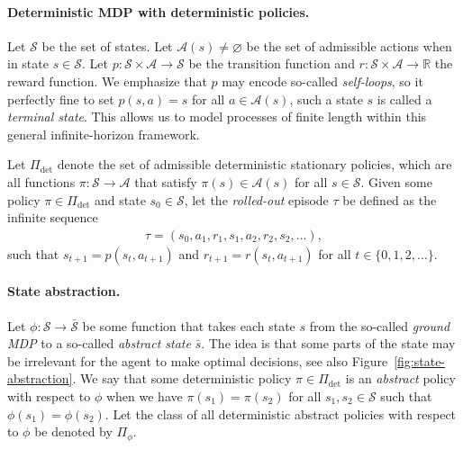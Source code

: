 \documentclass[a4paper]{report}
\theoremstyle{definition}
\theoremstyle{plain}
\begin{document}
\paragraph{Deterministic MDP with deterministic policies.}

Let $\mathcal{S}$ be the set of states. Let $\mathcal{A}(s) \neq \varnothing$ be
the set of admissible actions when in state $s \in \mathcal{S}$. Let
$p : \mathcal{S} \times \mathcal{A} \rightarrow \mathcal{S}$ be the transition
function and $r : \mathcal{S} \times \mathcal{A} \rightarrow \mathbb{R}$ the
reward function.
We emphasize that $p$ may encode so-called \emph{self-loops}, so it perfectly
fine to set $p(s, a) = s$ for all $a \in \mathcal{A}(s)$, such a state $s$ is
called a \emph{terminal state}. This allows us to model processes of finite
length within this general infinite-horizon framework.

Let $\Pi_\text{det}$ denote the set of admissible deterministic stationary
policies, which are all functions $\pi: \mathcal{S} \rightarrow \mathcal{A}$
that satisfy $\pi(s) \in \mathcal{A}(s)$ for all $s \in \mathcal{S}$.
%
Given some policy $\pi \in \Pi_\text{det}$ and state $s_0 \in \mathcal{S}$, let
the \emph{rolled-out} episode $\tau$ be defined as the infinite sequence
\begin{align}
  \tau = (s_0, a_1, r_1, s_1, a_2, r_2, s_2, \dots) ,
\end{align}
such that $s_{t+1} = p(s_t, a_{t+1})$ and $r_{t+1} = r(s_t, a_{t+1})$ for all
$t \in \{ 0, 1, 2, \dots \}$.

\paragraph{State abstraction.}

Let $\phi : \mathcal{S} \rightarrow \bar{\mathcal{S}}$ be some function that
takes each state $s$ from the so-called \emph{ground MDP} to a so-called
\emph{abstract state} $\bar{s}$.
%
The idea is that some parts of the state may be irrelevant for the agent to make
optimal decisions, see also Figure~\ref{fig:state-abstraction}.
%
%
We say that some deterministic policy $\pi \in \Pi_\text{det}$ is an
\emph{abstract} policy with respect to $\phi$ when we have $\pi(s_1) = \pi(s_2)$
for all $s_1, s_2 \in \mathcal{S}$ such that $\phi(s_1) = \phi(s_2)$.
%
Let the class of all deterministic abstract policies with respect to $\phi$ be
denoted by $\Pi_\phi$.
\end{document}
